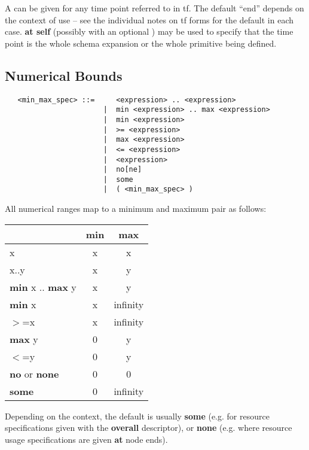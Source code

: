A  can be given for any time point referred to in {\sc tf}.
The default ``end'' depends on the context of use -- see the individual notes
on {\sc tf} forms for the default in each case.  {\bf at self} (possibly with
an optional {\tt {}}) may be used to specify that the time point is the
whole schema expansion or the whole primitive being defined.

\subsection{Numerical Bounds}

\begin{verbatim}
   <min_max_spec> ::=     <expression> .. <expression>
                       |  min <expression> .. max <expression>
                       |  min <expression>
                       |  >= <expression>
                       |  max <expression>
                       |  <= <expression>
                       |  <expression>
                       |  no[ne]
                       |  some
                       |  ( <min_max_spec> )
\end{verbatim}

All numerical ranges map to a minimum and maximum pair as follows:

\begin{center} 
\begin{tabular}{|l|c|c|}
\hline
&min&max \\
\hline
x&x&x \\
x..y&x&y \\
{\bf min} x .. {\bf max} y&x&y \\
{\bf min} x&x&infinity \\
$>$=x&x&infinity \\
{\bf max} y&0&y \\
$<$=y&0&y \\
{\bf no} or {\bf none}&0&0 \\
{\bf some}&0&infinity \\
\hline
\end{tabular}
\end{center}

Depending on the context, the default is usually {\bf some}
(e.g. for resource specifications given with the {\bf overall}
descriptor), or {\bf none} (e.g. where
resource usage specifications are given {\bf at} node ends). 

